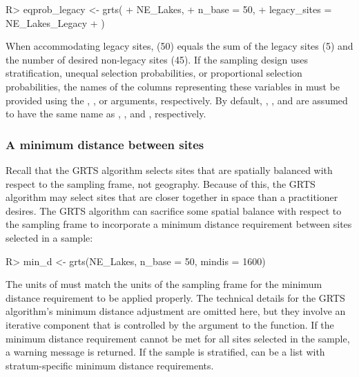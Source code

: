 \documentclass[
  shortnames]{jss}
\begin{document}
\begin{CodeChunk}
\begin{CodeInput}
R> eqprob_legacy <- grts(
+   NE_Lakes,
+   n_base = 50,
+   legacy_sites = NE_Lakes_Legacy
+ )
\end{CodeInput}
\end{CodeChunk}

When accommodating legacy sites,  (50) equals the sum of
the legacy sites (5) and the number of desired non-legacy sites (45). If
the sampling design uses stratification, unequal selection
probabilities, or proportional selection probabilities, the names of the
columns representing these variables in  must be
provided using the , , or
 arguments, respectively. By default, \linebreak
{}, , and
 are assumed to have the same name as
, , and , respectively.

\hypertarget{subsubsec:mindis}{%
\subsubsection{A minimum distance between
sites}\label{subsubsec:mindis}}

Recall that the GRTS algorithm selects sites that are spatially balanced
with respect to the sampling frame, not geography. Because of this, the
GRTS algorithm may select sites that are closer together in space than a
practitioner desires. The GRTS algorithm can sacrifice some spatial
balance with respect to the sampling frame to incorporate a minimum
distance requirement between sites selected in a sample:

\begin{CodeChunk}
\begin{CodeInput}
R> min_d <- grts(NE_Lakes, n_base = 50, mindis = 1600)
\end{CodeInput}
\end{CodeChunk}

The units of  must match the units of the sampling frame
for the minimum distance requirement to be applied properly. The
technical details for the GRTS algorithm's minimum distance adjustment
are omitted here, but they involve an iterative component that is
controlled by the  argument to the  function.
If the minimum distance requirement cannot be met for all sites selected
in the sample, a warning message is returned. If the sample is
stratified,  can be a list with stratum-specific minimum
distance requirements.
\end{document}
